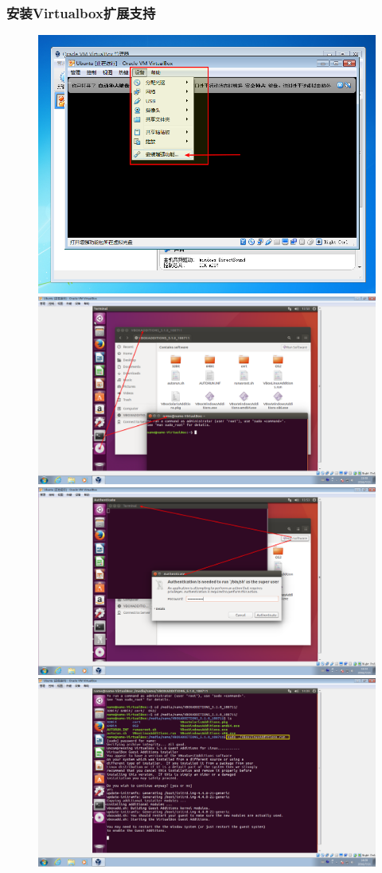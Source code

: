 \frame
{
	\frametitle{安装\textrm{Virtualbox}扩展支持}
\begin{figure}[h!]
\centering
\vspace{-2.5pt}
\includegraphics[height=0.30\textwidth]{Figures/Virtualbox-ubuntu-install-11.png}
\includegraphics[height=0.30\textwidth]{Figures/Virtualbox-ubuntu-install-12.png}
\includegraphics[height=0.27\textwidth]{Figures/Virtualbox-ubuntu-install-13.png}
\includegraphics[height=0.27\textwidth]{Figures/Virtualbox-ubuntu-install-14.png}
\label{Virtualbox-ubuntu-install-5}
\end{figure}
}

